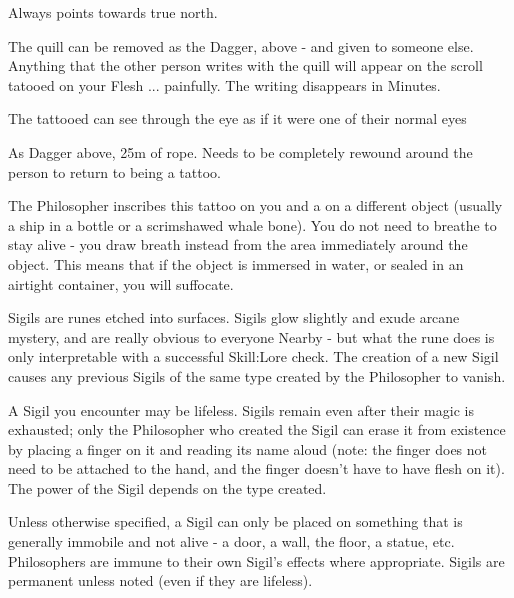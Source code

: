 {

Always points towards true north.  


The quill can be removed as the Dagger, above - and given to someone else.  Anything that the other person writes with the quill will appear on the scroll tatooed on your Flesh ... painfully.  The writing disappears in Minutes.


The tattooed can see through the eye as if it were one of their normal eyes


As Dagger above, 25m of rope. Needs to be completely rewound around the person to return to being a tattoo.



The Philosopher inscribes this tattoo on you and a  on a different object (usually a ship in a bottle or a scrimshawed whale bone).  You do not need to breathe to stay alive - you draw breath instead from the area immediately around the object.  This means that if the object is immersed in water, or sealed in an airtight container, you will suffocate.


Sigils are runes etched into surfaces.  Sigils glow slightly and exude arcane mystery, and are really obvious to everyone Nearby - but what the rune does is only interpretable with a successful Skill:Lore check.  The creation of a new Sigil causes any previous Sigils of the same type created by the Philosopher to vanish.

A Sigil you encounter may be lifeless.  Sigils remain even after their magic is exhausted; only the Philosopher who created the Sigil can erase it from existence by placing a finger on it and reading its name aloud (note: the finger does not need to be attached to the hand, and the finger doesn't have to have flesh on it).  The power of the Sigil depends on the type created.

Unless otherwise specified, a Sigil can only be placed on something that is generally immobile and not alive - a door, a wall, the floor, a statue, etc.  Philosophers are immune to their own Sigil's effects where appropriate.  Sigils are permanent unless noted (even if they are lifeless).

}
